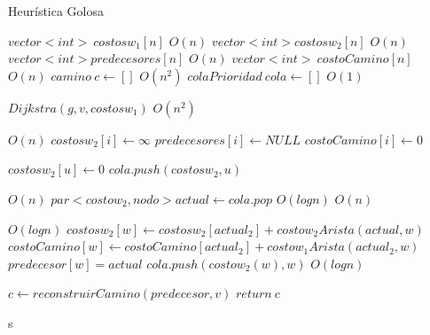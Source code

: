 \begin{algorithm}
	\caption{Heur\'istica Golosa}
\begin{algorithmic}[1]
\Statex


\State $ vector<int> \: costosw_1[n] $
\Comment $O(n)$
\State $vector<int> costosw_2[n]$
\Comment $O(n)$
\State $vector<int> predecesores[n]$
\Comment $O(n)$
\State $ vector<int> \: costoCamino[n] $
\Comment $O(n)$
\State $camino \: c \gets [] $
\Comment $O(n^2)$
\State $colaPrioridad \: cola \gets []$
\Comment $O(1)$

\Statex

\State $ Dijkstra(g, v, costosw_1) $
\Comment $O(n^2)$

\Statex

\Comment $ O(n)$
	\State $ costosw_2[i] \gets \infty $
	\State $ predecesores[i] \gets NULL $
	\State $ costoCamino[i] \gets 0 $	
\EndFor

\State $ costosw_2[u] \gets 0 $
\Statex
\State $ cola.push(costosw_2, u) $

	\Comment $ O(n)$
	\State $ par<costow_2, nodo> actual \gets cola.pop $
	\Comment $O(logn)$
		\Comment $ O(n)$
		

			\Comment $O(logn)$
			\State $ costosw_2[w] \gets costosw_2[actual_2] + costow_2Arista(actual,w) $
			\State $ costoCamino[w] \gets costoCamino[actual_2] + costow_1Arista(actual_2,w) $
			\State $ predecesor[w] = actual $
			\State $cola.push(costow_2(w), w)$
			\Comment $O(logn)$


			\EndIf

		\EndIf
	\EndFor

\EndWhile

\State $ c \gets reconstruirCamino(predecesor,v) $
\State $ return \:c $

\EndProcedure
\end{algorithmic}
\end{algorithm}


s